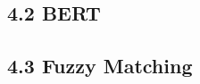 \documentclass[
	a4paper, %
	10pt, %
	unnumberedsections, %
	twoside, %
]{LTJournalArticle}
\begin{document}
\subsection{4.2 BERT}

\subsection{4.3 Fuzzy Matching}






\end{document}
